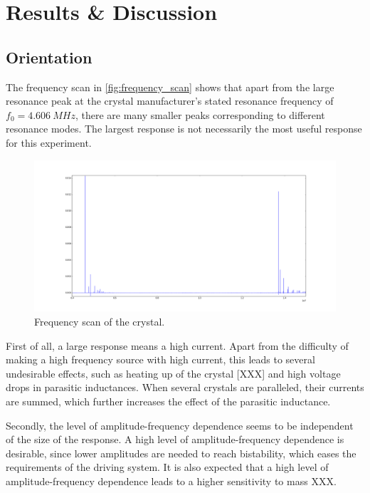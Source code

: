 \clearpage\section{Results \& Discussion}

\subsection{Orientation}
The frequency scan in \autoref{fig:frequency_scan} shows that apart from the large resonance peak at the crystal manufacturer's stated resonance frequency of $f_0 = \SI{4.606}{MHz}$, there are many smaller peaks corresponding to different resonance modes. The largest response is not necessarily the most useful response for this experiment. 

\begin{figure}
	\centering
		\includegraphics[width=\textwidth]{figures/frequency_scan.png}
	\caption{Frequency scan of the crystal.}
	\label{fig:frequency_scan}
\end{figure}

First of all, a large response means a high current. Apart from the difficulty of making a high frequency source with high current, this leads to several undesirable effects, such as heating up of the crystal [XXX] and high voltage drops in parasitic inductances. When several crystals are paralleled, their currents are summed, which further increases the effect of the parasitic inductance. 

Secondly, the level of amplitude-frequency dependence seems to be independent of the size of the response. A high level of amplitude-frequency dependence is desirable, since lower amplitudes are needed to reach bistability, which eases the requirements of the driving system. It is also expected that a high level of amplitude-frequency dependence leads to a higher sensitivity to mass XXX. 


